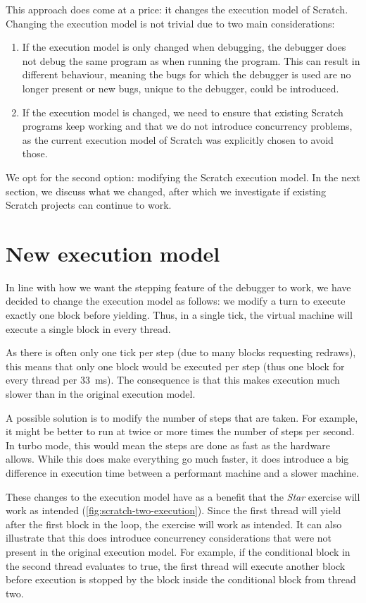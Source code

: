 \documentclass[../main]{subfiles}
\begin{document}
This approach does come at a price: it changes the execution model of Scratch.
Changing the execution model is not trivial due to two main considerations:

\begin{enumerate}
    \item If the execution model is only changed when debugging, the debugger does not debug the same program as when running the program.
        This can result in different behaviour, meaning the bugs for which the debugger is used are no longer present or new bugs, unique to the debugger, could be introduced.
    \item If the execution model is changed, we need to ensure that existing Scratch programs keep working and that we do not introduce concurrency problems, as the current execution model of Scratch was explicitly chosen to avoid those.
\end{enumerate}

We opt for the second option: modifying the Scratch execution model.
In the next section, we discuss what we changed, after which we investigate if existing Scratch projects can continue to work.

\section{New execution model}\label{sec:a-family-of-new-execution-models}

In line with how we want the stepping feature of the debugger to work, we have decided to change the execution model as follows: we modify a turn to execute exactly one block before yielding.
Thus, in a single tick, the virtual machine will execute a single block in every thread.

As there is often only one tick per step (due to many blocks requesting redraws), this means that only one block would be executed per step (thus one block for every thread per \qty{33}{\milli\second}).
The consequence is that this makes execution much slower than in the original execution model.

A possible solution is to modify the number of steps that are taken.
For example, it might be better to run at twice or more times the number of steps per second.
In turbo mode, this would mean the steps are done as fast as the hardware allows.
While this does make everything go much faster, it does introduce a big difference in execution time between a performant machine and a slower machine.

These changes to the execution model have as a benefit that the \emph{Star} exercise will work as intended (\cref{fig:scratch-two-execution}).
Since the first thread will yield after the first block in the loop, the exercise will work as intended.
It can also illustrate that this does introduce concurrency considerations that were not present in the original execution model.
For example, if the conditional block in the second thread evaluates to true, the first thread will execute another block before execution is stopped by the block inside the conditional block from thread two.
\end{document}
